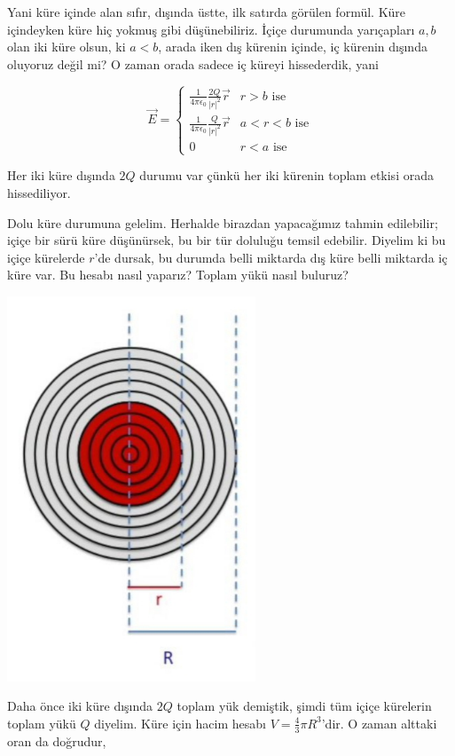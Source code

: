 \documentclass[12pt,fleqn]{article}\usepackage{../../common}
\begin{document}
Yani küre içinde alan sıfır, dışında üstte, ilk satırda görülen formül. Küre
içindeyken küre hiç yokmuş gibi düşünebiliriz. İçiçe durumunda yarıçapları $a,b$
olan iki küre olsun, ki $a<b$, arada iken dış kürenin içinde, iç kürenin dışında
oluyoruz değil mi? O zaman orada sadece iç küreyi hissederdik, yani

$$
\vec{E} = \left\{ \begin{array}{ll}
\frac{1}{4\pi\epsilon_0} \frac{2Q}{|r|^2} \vec{r} & r>b \textrm{ ise}\\
\frac{1}{4\pi\epsilon_0} \frac{Q}{|r|^2} \vec{r} & a<r<b \textrm{ ise}\\
0 & r<a \textrm{ ise}
\end{array} \right.
$$

Her iki küre dışında $2Q$ durumu var çünkü her iki kürenin toplam etkisi orada
hissediliyor.

Dolu küre durumuna gelelim. Herhalde birazdan yapacağımız tahmin edilebilir;
içiçe bir sürü küre düşünürsek, bu bir tür doluluğu temsil edebilir. Diyelim ki
bu içiçe kürelerde $r$'de dursak, bu durumda belli miktarda dış küre belli
miktarda iç küre var. Bu hesabı nasıl yaparız? Toplam yükü nasıl buluruz?

\includegraphics[width=20em]{07_05.jpg}

Daha önce iki küre dışında $2Q$ toplam yük demiştik, şimdi tüm içiçe kürelerin
toplam yükü $Q$ diyelim. Küre için hacim hesabı $V = \frac{4}{3} \pi
R^3$'dir. O zaman alttaki oran da doğrudur,
\end{document}
